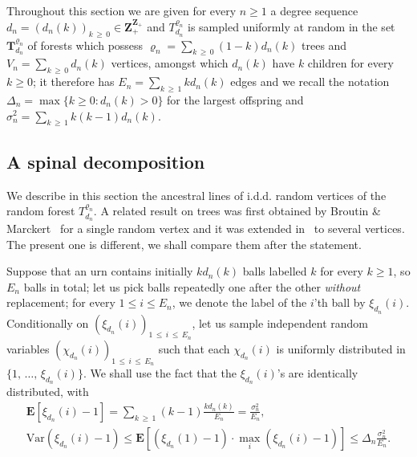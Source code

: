 \documentclass[AHL,Unicode,longabstracts,published]{cedram}
\newcommand{\ensembles}[1]{\mathbf{#1}}
\newcommand{\Z}{\ensembles{Z}}
\newcommand{\E}{\ensembles{E}}
\newcommand{\Es}[1]{\E\left[#1\right]}
\newcommand{\1}{\ensembles{1}}
\newcommand{\Tree}{\mathbf{T}}
\renewcommand{\le}{\leqslant}
\renewcommand{\ge}{\geqslant}
\newcommand{\Var}{\mathrm{Var}}
\newcommand{\Fn}{\Tree_{d_n}^{\varrho_n}}
\newcommand{\fn}{T_{d_n}^{\varrho_n}}
\newcommand{\edges}{E}
\newcommand{\vertices}{V}
\begin{document}
Throughout this section we are given for every $n \ge 1$ a degree sequence $d_n = (d_n(k))_{k\,\ge\,0} \in \Z_+^{\Z_+}$ and $\fn$ is sampled uniformly at random in the set $\Fn$ of forests which possess $\varrho_n = \sum_{k\,\ge\,0} (1-k) d_n(k)$ trees and $\vertices_n = \sum_{k\,\ge\,0} d_n(k)$ vertices, amongst which $d_n(k)$ have $k$ children for every $k \ge 0$; it therefore has $\edges_n = \sum_{k\,\ge\,1} k d_n(k)$ edges and we recall the notation $\Delta_n = \max\{k \ge 0 : d_n(k) > 0\}$ for the largest offspring and $\sigma_n^2 = \sum_{k \,\ge\,1} k (k-1) d_n(k)$.



\subsection{A spinal decomposition}\label{sec:epine}


We describe in this section the ancestral lines of i.d.d. random vertices of the random forest $\fn$. A related result on trees was first obtained by Broutin \& Marckert~\cite{BM14} for a single random vertex and it was extended in~\cite{Mar18b} to several vertices. The present one is different, we shall compare them after the statement.

Suppose that an urn contains initially $k d_n(k)$ balls labelled $k$ for every $k \ge 1$, so $\edges_n$ balls in total; let us pick balls repeatedly one after the other \emph{without} replacement; for every $1 \le i \le \edges_n$, we denote the label of the $i$'th ball by $\xi_{d_n}(i)$. Conditionally on $(\xi_{d_n}(i))_{1\,\le\, i\,\le\,\edges_n}$, let us sample independent random variables $(\chi_{d_n}(i))_{1\,\le\,i\,\le\,\edges_n}$ such that each $\chi_{d_n}(i)$ is uniformly distributed in $\{1,\,\dots,\,\xi_{d_n}(i)\}$. We shall use the fact that the $\xi_{d_n}(i)$'s are identically distributed, with
\begin{equation}\label{eq:moyenne_biais_par_la_taille}
\begin{gathered}
\Es{\xi_{d_n}(i) - 1} = \sum_{k\,\ge\,1} (k-1) \frac{k d_n(k)}{\edges_n} = \frac{\sigma_n^2}{\edges_n},
\\
\Var\left(\xi_{d_n}(i)-1\right) \le \Es{\left(\xi_{d_n}(1)-1\right) \cdot \max_i \left(\xi_{d_n}(i)-1\right)} \le \Delta_n \frac{\sigma_n^2}{\edges_n}.
\end{gathered}
\end{equation}
\end{document}
